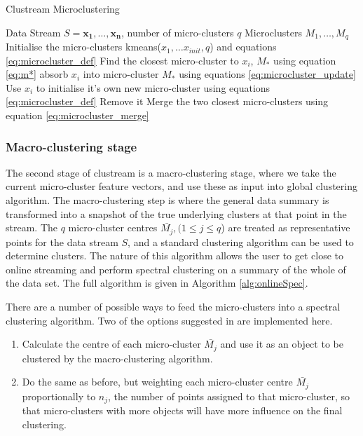 \begin{algorithm}
\caption{Clustream Microclustering}  
\begin{algorithmic}
\REQUIRE Data Stream $S = {\boldsymbol{x_1},\ldots, \boldsymbol{x_n}  }$, number of micro-clusters $q$
\ENSURE Microclusters $M_1, \ldots, M_q$
\STATE Initialise the micro-clusters kmeans($x_1, \hdots x_{init},q$) and equations \eqref{eq:microcluster_def}
 \STATE Find the closest micro-cluster to $x_i$, $M_*$ using equation \eqref{eq:m*}
   \STATE absorb $x_i$ into micro-cluster $M_*$ using equations \eqref{eq:microcluster_update}
 \ELSE
 \STATE Use $x_i$ to initialise it's own new micro-cluster using equations \eqref{eq:microcluster_def}
   \STATE Remove it
  \ELSE 
   \STATE Merge the two closest micro-clusters using equation \eqref{eq:microcluster_merge}
  \ENDIF
\ENDIF
\ENDFOR
\end{algorithmic}
\label{alg:clustream}
\end{algorithm}
\subsubsection{Macro-clustering stage}
 
The second stage of clustream is a macro-clustering stage, where we take the current micro-cluster feature vectors, and use these as input into global clustering algorithm. The macro-clustering step is where the general data summary is transformed into a snapshot of the true underlying clusters at that point in the stream. The $q$ micro-cluster centres $\bar{M_j},(1 \leq j \leq q$) are treated as representative points for the data stream $S$, and a standard clustering algorithm can be used to determine clusters. The nature of this algorithm allows the user to get close to online streaming and perform spectral clustering on a summary of the whole of the data set. The full algorithm is given in Algorithm \ref{alg:onlineSpec}.

There are a number of possible ways to feed the micro-clusters into a spectral clustering algorithm. Two of the options suggested in \cite{Zhang1996a} are implemented here. 

\begin{enumerate}
\item Calculate the centre of each micro-cluster $\bar{M_j}$ and use it as an object to be clustered by the macro-clustering algorithm.
\item Do the same as before, but weighting each micro-cluster centre $\bar{M_j}$ proportionally to $n_j$, the number of points assigned to that micro-cluster, so that micro-clusters with more objects will have more influence on the final clustering.
\end{enumerate}


